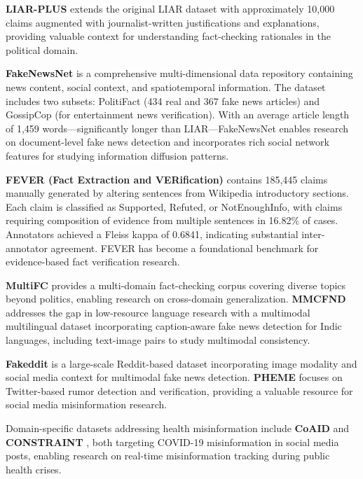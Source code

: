 \textbf{LIAR-PLUS} \cite{liarplus2019} extends the original LIAR dataset with approximately 10,000 claims augmented with journalist-written justifications and explanations, providing valuable context for understanding fact-checking rationales in the political domain.

\textbf{FakeNewsNet} \cite{fakenewsnet2020} is a comprehensive multi-dimensional data repository containing news content, social context, and spatiotemporal information. The dataset includes two subsets: PolitiFact (434 real and 367 fake news articles) and GossipCop (for entertainment news verification). With an average article length of 1,459 words---significantly longer than LIAR---FakeNewsNet enables research on document-level fake news detection and incorporates rich social network features for studying information diffusion patterns.

\textbf{FEVER (Fact Extraction and VERification)} \cite{fever2018} contains 185,445 claims manually generated by altering sentences from Wikipedia introductory sections. Each claim is classified as Supported, Refuted, or NotEnoughInfo, with claims requiring composition of evidence from multiple sentences in 16.82\% of cases. Annotators achieved a Fleiss kappa of 0.6841, indicating substantial inter-annotator agreement. FEVER has become a foundational benchmark for evidence-based fact verification research.

\textbf{MultiFC} \cite{multifc2019} provides a multi-domain fact-checking corpus covering diverse topics beyond politics, enabling research on cross-domain generalization. \textbf{MMCFND} \cite{mmcfnd_arxiv} addresses the gap in low-resource language research with a multimodal multilingual dataset incorporating caption-aware fake news detection for Indic languages, including text-image pairs to study multimodal consistency.

\textbf{Fakeddit} \cite{fakeddit2020} is a large-scale Reddit-based dataset incorporating image modality and social media context for multimodal fake news detection. \textbf{PHEME} \cite{pheme2016} focuses on Twitter-based rumor detection and verification, providing a valuable resource for social media misinformation research.

Domain-specific datasets addressing health misinformation include \textbf{CoAID} \cite{coaid2020} and \textbf{CONSTRAINT} \cite{constraint2021}, both targeting COVID-19 misinformation in social media posts, enabling research on real-time misinformation tracking during public health crises.

